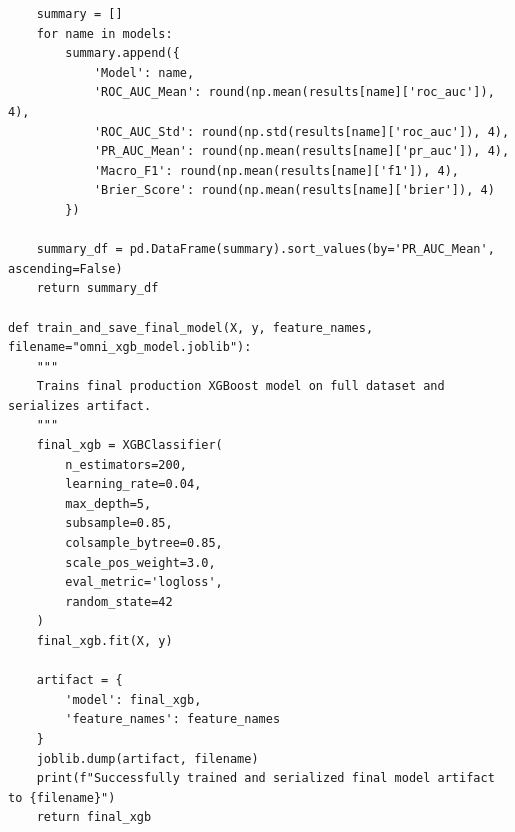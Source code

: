 \documentclass[11pt, a4paper]{article}
\begin{document}
\begin{verbatim}
    summary = []
    for name in models:
        summary.append({
            'Model': name,
            'ROC_AUC_Mean': round(np.mean(results[name]['roc_auc']), 4),
            'ROC_AUC_Std': round(np.std(results[name]['roc_auc']), 4),
            'PR_AUC_Mean': round(np.mean(results[name]['pr_auc']), 4),
            'Macro_F1': round(np.mean(results[name]['f1']), 4),
            'Brier_Score': round(np.mean(results[name]['brier']), 4)
        })
        
    summary_df = pd.DataFrame(summary).sort_values(by='PR_AUC_Mean', ascending=False)
    return summary_df

def train_and_save_final_model(X, y, feature_names, filename="omni_xgb_model.joblib"):
    """
    Trains final production XGBoost model on full dataset and serializes artifact.
    """
    final_xgb = XGBClassifier(
        n_estimators=200,
        learning_rate=0.04,
        max_depth=5,
        subsample=0.85,
        colsample_bytree=0.85,
        scale_pos_weight=3.0,
        eval_metric='logloss',
        random_state=42
    )
    final_xgb.fit(X, y)
    
    artifact = {
        'model': final_xgb,
        'feature_names': feature_names
    }
    joblib.dump(artifact, filename)
    print(f"Successfully trained and serialized final model artifact to {filename}")
    return final_xgb
\end{verbatim}
\end{document}
